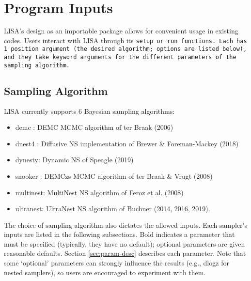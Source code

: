 \documentclass[letterpaper, 12pt]{article}
\begin{document}
\section{Program Inputs}
\label{sec:inputs}

LISA's design as an importable package allows for convenient usage in existing 
codes.  Users interact with LISA through its \tt{setup} or \tt{run} functions. 
Each has 1 position argument (the desired algorithm; options are listed below), 
and they take keyword arguments for the different parameters of the sampling 
algorithm.  

\subsection{Sampling Algorithm}

LISA currently supports 6 Bayesian sampling algorithms:
\begin{itemize}
\item demc   : DEMC MCMC algorithm of ter Braak (2006)
\item dnest4 : Diffusive NS implementation of Brewer \& Foreman-Mackey (2018)
\item dynesty: Dynamic NS of Speagle (2019)
\item snooker  : DEMCzs MCMC algorithm of ter Braak \& Vrugt (2008)
\item multinest: MultiNest NS algorithm of Feroz et al. (2008)
\item ultranest: UltraNest NS algorithm of Buchner (2014, 2016, 2019).
\end{itemize}

\noindent The choice of sampling algorithm also dictates the allowed inputs.  
Each sampler's inputs are listed in the following subsections.  Bold 
indicates a parameter that must be specified (typically, they have no default); 
optional parameters are given reasonable defaults.  Section 
\ref{sec:param-desc} describes each parameter.  Note that some `optional' 
parameters can strongly influence the results (e.g., dlogz for nested samplers),
so users are encouraged to experiment with them.
\end{document}
